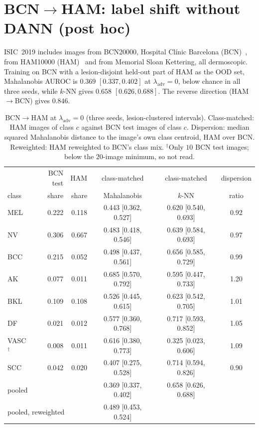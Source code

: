 \documentclass{midl}
\newcommand{\lam}{\lambda_{\mathrm{adv}}}
\begin{document}
\FloatBarrier
\section{BCN$\to$HAM: label shift without DANN (post hoc)}
\label{app:site}

ISIC~2019 includes images from BCN20000, Hospital Cl\'inic Barcelona
(BCN)~\cite{combalia2019}, from HAM10000 (HAM)~\cite{tschandl2018} and from Memorial Sloan Kettering, all dermoscopic. Training on BCN with a lesion-disjoint held-out part of HAM as the OOD set,
Mahalanobis AUROC is $0.369$ $[0.337, 0.402]$ at $\lam=0$, below chance in all three seeds,
while $k$-NN gives $0.658$ $[0.626, 0.688]$. The reverse direction (HAM$\to$BCN) gives $0.846$.

\begin{table}[h]
\centering
\caption{BCN$\to$HAM at $\lam=0$ (three seeds, lesion-clustered intervals). Class-matched:
HAM images of class $c$ against BCN test images of class $c$. Dispersion: median squared
Mahalanobis distance to the image's own class centroid, HAM over BCN. Reweighted: HAM reweighted to
BCN's class mix. $^\dagger$Only $10$ BCN test images; below the $20$-image minimum, so not read.}
\label{tab:bcnham}
\begin{tabular}{lrrccc}
\toprule
 & BCN test & HAM & class-matched & class-matched & dispersion \\
class & share & share & Mahalanobis & $k$-NN & ratio \\
\midrule
MEL & 0.222 & 0.118 & 0.443 [0.362, 0.527] & 0.620 [0.540, 0.693] & 0.92 \\
NV & 0.306 & 0.667 & 0.483 [0.418, 0.546] & 0.639 [0.584, 0.693] & 0.97 \\
BCC & 0.215 & 0.052 & 0.498 [0.437, 0.561] & 0.656 [0.585, 0.729] & 0.99 \\
AK & 0.077 & 0.011 & 0.685 [0.570, 0.792] & 0.595 [0.447, 0.733] & 1.20 \\
BKL & 0.109 & 0.108 & 0.526 [0.445, 0.615] & 0.623 [0.542, 0.705] & 1.01 \\
DF & 0.021 & 0.012 & 0.577 [0.360, 0.768] & 0.717 [0.593, 0.852] & 1.05 \\
VASC$^\dagger$ & 0.008 & 0.011 & 0.616 [0.380, 0.773] & 0.325 [0.023, 0.606] & 1.09 \\
SCC & 0.042 & 0.020 & 0.407 [0.275, 0.528] & 0.714 [0.594, 0.826] & 0.90 \\
\midrule
\multicolumn{3}{l}{pooled} & 0.369 [0.337, 0.402] & 0.658 [0.626, 0.688] &  \\
\multicolumn{3}{l}{pooled, reweighted} & 0.489 [0.453, 0.524] &  &  \\
\bottomrule
\end{tabular}
\end{table}
\end{document}
